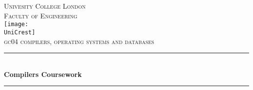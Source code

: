 \documentclass[fontsize=10pt]{extarticle}
\numberwithin{figure}{section} %
\newcommand{\AssignmentTitle}{Compilers Coursework}
\newcommand{\ModuleTitle}{gc04 compilers, operating systems and databases}
\newcommand{\University}{Univesity College London}
\newcommand{\Faculty}{Faculty of Engineering}
\newcommand{\UniCrest}{logoucl.png}
\newcommand{\horrule}[1]{\rule{\linewidth}{#1}}
\begin{document}
% 

  \setlength{\abovedisplayskip}{-18pt}
  \setlength{\belowdisplayskip}{0pt}
  \setlength{\abovedisplayshortskip}{-18pt}
  \setlength{\belowdisplayshortskip}{0pt}



\begin{titlepage}

	\center %
		\normalfont \normalsize \textsc{\University} \\ [10pt]
		\normalfont \normalsize \textsc{\Faculty} \\ [25pt]
		\texttt{[image: \\UniCrest]}\\[0.5cm]
		\normalfont \normalsize \textsc{\ModuleTitle} \\ [25pt]
		\horrule{0.5pt} \\[0.4cm]
		\huge \textbf{\AssignmentTitle} \\
		\horrule{2pt} \\[0.5cm]

\end{titlepage}
\end{document}
